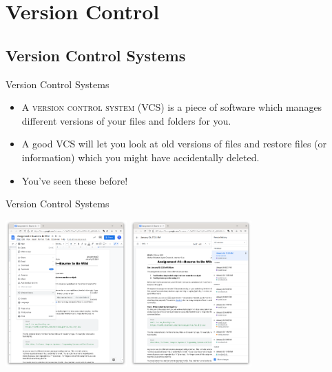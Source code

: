 \section{Version Control}
\subsection{Version Control Systems}

\begin{frame}{Version Control Systems}
  \begin{itemize}
    \item A \textsc{version control system} (VCS) is a piece of software which
      manages different versions of your files and folders for you.
    \pause
    \item A good VCS will let you look at old versions of files and restore
      files (or information) which you might have accidentally deleted.
    \pause
    \item You've seen these before!
  \end{itemize}
\end{frame}

\begin{frame}{Version Control Systems}
  \vspace{-1em}
  \begin{center}
    \includegraphics[width=0.35\textwidth]{images/google-docs-vcs.png}
    \includegraphics[width=0.35\textwidth]{images/assign2-versions.png}
  \end{center}
\end{frame}

